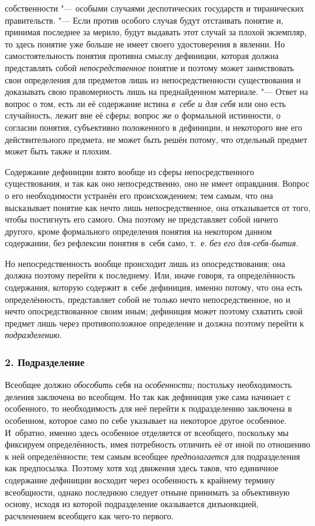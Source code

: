 собственности "--- особыми случаями деспотических государств и
тиранических правительств. "--- Если против особого случая
будут отстаивать понятие и, принимая последнее за мерило, будут выдавать
этот случай за плохой экземпляр, то здесь понятие уже больше не имеет
своего удостоверения в явлении. Но самостоятельность понятия противна
смыслу дефиниции, которая должна представлять собой
{\em непосредственное}
понятие и поэтому может заимствовать свои определения для
предметов лишь из непосредственности существования и доказывать свою
правомерность лишь на преднайденном материале. "--- Ответ на
вопрос о том, есть ли её содержание истина
{\em в~себе и для себя}
или оно есть случайность, лежит вне её сферы; вопрос же о
формальной истинности, о согласии понятия, субъективно положенного в
дефиниции, и некоторого вне его действительного предмета, не может быть
решён потому, что отдельный предмет может быть также и плохим.

Содержание дефиниции взято вообще из сферы непосредственного
существования, и так как оно непосредственно, оно не имеет оправдания.
Вопрос о его необходимости устранён его происхождением; тем самым, что она
высказывает понятие как нечто лишь непосредственное, она отказывается от
того, чтобы постигнуть его самого. Она поэтому не представляет собой ничего
другого, кроме формального определения понятия на некотором данном
содержании, без рефлексии понятия в~себя само, т.~е.
{\em без его для-себя-бытия}.

Но непосредственность вообще происходит лишь из
опосредствования; она должна поэтому перейти к последнему. Или,
иначе говоря, та определённость содержания, которую содержит
в~себе дефиниция, именно потому, что она есть определённость, представляет
собой не только нечто непосредственное, но и нечто опосредствованное своим
иным; дефиниция может поэтому схватить свой предмет лишь через
противоположное определение и должна поэтому перейти к
{\em подразделению}.

\subsubsection[2. Подразделение]{\bfseries 2. Подразделение}

Всеобщее должно {\em обособить} себя на {\em особенности;}
постольку необходимость деления заключена во всеобщем. Но так
как дефиниция уже сама начинает с особенного, то необходимость для неё
перейти к подразделению заключена в особенном, которое само по себе
указывает на некоторое другое особенное. И~обратно, именно здесь особенное
отделяется от всеобщего, поскольку мы фиксируем определённость, имея
потребность отличить её от иной по отношению к ней определённости; тем
самым всеобщее {\em предполагается}
для подразделения как предпосылка. Поэтому хотя ход движения
здесь таков, что единичное содержание дефиниции восходит через особенность
к крайнему термину всеобщности, однако последнюю следует отныне принимать
за объективную основу, исходя из которой подразделение оказывается
дизъюнкцией, расчленением всеобщего как чего-то первого.


